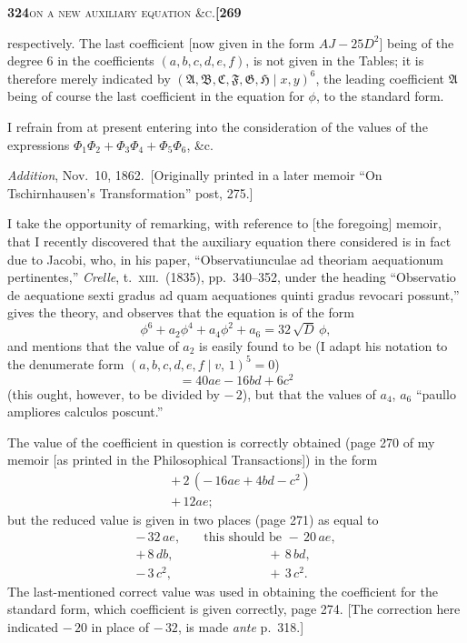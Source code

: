 \documentclass[11pt]{article}
\newcommand{\Cdel}{\mid}
\begin{document}
\newpage
\setcounter{page}{324}

\noindent\textbf{324}\hfill\textsc{on a new auxiliary equation \&c.}\hfill\textbf{[269}

\medskip

\noindent respectively. The last coefficient [now given in the form $A J - 25 D^2$] being of the degree 6 in the coefficients $(a, b, c, d, e, f)$, is not given in the Tables; it is therefore merely indicated by $(\mathfrak{A},\mathfrak{B},\mathfrak{C},\mathfrak{F},\mathfrak{G},\mathfrak{H}\Cdel x, y)^6$, the leading coefficient $\mathfrak{A}$ being of course the last coefficient in the equation for $\phi$, to the standard form.

\medskip

\noindent I refrain from at present entering into the consideration of the values of the expressions $\Phi_1\Phi_2 + \Phi_3\Phi_4 + \Phi_5\Phi_6$, \&c.

\medskip

\begin{center}\textit{Addition}, Nov.~10, 1862.\ [Originally printed in a later memoir ``On Tschirnhausen's Transformation'' post, 275.]\end{center}

\medskip

\noindent I take the opportunity of remarking, with reference to [the foregoing] memoir, that I recently discovered that the auxiliary equation there considered is in fact due to Jacobi, who, in his paper, ``Observatiunculae ad theoriam aequationum pertinentes,'' \textit{Crelle}, t.~\textsc{xiii}.\ (1835), pp.~340--352, under the heading ``Observatio de aequatione sexti gradus ad quam aequationes quinti gradus revocari possunt,'' gives the theory, and observes that the equation is of the form
\[
   \phi^6 + a_2\phi^4 + a_4\phi^2 + a_6 = 32\,\sqrt{D}\,\phi,
\]
and mentions that the value of $a_2$ is easily found to be (I adapt his notation to the denumerate form $(a, b, c, d, e, f\Cdel v,\,1)^5 = 0$)
\[
   = 40 a e - 16 b d + 6 c^2
\]
(this ought, however, to be divided by $-\,2$), but that the values of $a_4$, $a_6$ ``paullo ampliores calculos poscunt.''

\medskip

\noindent The value of the coefficient in question is correctly obtained (page 270 of my memoir [as printed in the Philosophical Transactions]) in the form
\[
\begin{aligned}
   & +\,2\,(-\,16 a e + 4 b d - c^2)\\
   & +\,12 a e;
\end{aligned}
\]
but the reduced value is given in two places (page 271) as equal to
\[
\begin{aligned}
   -\,32\,a e, &\quad\text{this should be } -\,20\,a e,\\
   +\,8\,d b, &\quad{} \quad\quad\quad\quad\quad +\,8\,b d,\\
   -\,3\,c^2, &\quad{} \quad\quad\quad\quad\quad +\,3\,c^2.
\end{aligned}
\]
The last-mentioned correct value was used in obtaining the coefficient for the standard form, which coefficient is given correctly, page 274. [The correction here indicated $-\,20$ in place of $-\,32$, is made \textit{ante} p.~318.]
\end{document}
